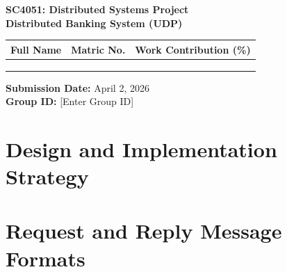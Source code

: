 \documentclass[11pt,a4paper]{article}
\begin{document}
\begin{titlepage}
    \centering
    \vspace*{2cm}
    {\huge \textbf{SC4051: Distributed Systems Project}}\\[1cm]
    {\Large \textbf{Distributed Banking System (UDP)}}\\[2cm]
    
    \begin{table}[h]
        \centering
        \begin{tabular}{|l|l|l|}
            \hline
            \textbf{Full Name} & \textbf{Matric No.} & \textbf{Work Contribution (\%)} \\
            \hline
            & & \\ \hline
            & & \\ \hline
            & & \\ \hline
        \end{tabular}
    \end{table}
    
    \vfill
    \textbf{Submission Date:} April 2, 2026\\
    \textbf{Group ID:} [Enter Group ID]
\end{titlepage}

\newpage
\tableofcontents
\newpage

\section{Design and Implementation Strategy}

\section{Request and Reply Message Formats}
\end{document}
